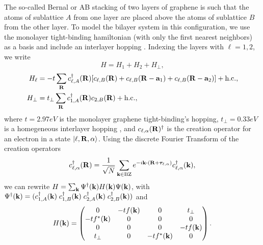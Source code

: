 \documentclass[12pt]{report}
\begin{document}
The so-called Bernal or AB stacking of two layers of graphene is such that the atoms of sublattice $A$ from one layer are placed above the atoms of sublattice $B$ from the other layer.
To model the bilayer system in this configuration, we use the monolayer tight-binding hamiltonian (with only the first
nearest neighbors) as a basis and include an interlayer hopping \cite{handbook2019}. Indexing the layers with $\ell = 1, 2$, we write
\begin{equation} \label{eq:ab-hamil}
H = H_1 + H_2 + H_{\perp},
\end{equation}
\begin{equation} \label{eq:ab-slg-hamil}
\begin{split}
H_\ell &= -t \sum_{\vb{R}} c_{\ell,A}^\dagger(\vb{R}) [c_{\ell,B}(\vb{R}) + c_{\ell,B}(\vb{R}-\vb{a}_1) + c_{\ell,B}(\vb{R}-\vb{a}_2)] + {\text{h.c.}}, \\
H_\perp &= t_{\perp} \sum_{\vb{R}} c_{1,A}^\dagger(\vb{R}) c_{2,B}(\vb{R}) + {\text{h.c.}},
\end{split}
\end{equation}
where $t = 2.97 \unit{eV}$ is the monolayer graphene tight-binding's hopping, $t_\perp = 0.33 \unit{eV}$ is a homegeneous interlayer hopping \cite{handbook2019}, and $c_{\ell,\alpha}(\vb{R})^\dagger$ is the creation operator for an electron in a state $\ket{\ell,\vb{R},\alpha}$. Using the discrete Fourier Transform of the creation operators
\begin{equation} \label{eq:ft-creatio}
c_{\ell,\alpha}^\d(\R) = \frac{1}{\sqrt{N}} \sum_{\k\in\text{BZ}} e^{-i\k\vdot(\R+\bm{\tau}_{\ell,\alpha})} c_{\ell,\alpha}^\d(\k),
\end{equation}
we can rewrite $H = \sum_{{\vb{k}}} \Psi^\dagger({\vb{k}}) H({\vb{k}}) \Psi({\vb{k}})$, with $\Psi^\dagger({\vb{k}}) = (c_{1,A}^\dagger({\vb{k}}) \; c_{1,B}^\dagger({\vb{k}}) \; c_{2,A}^\dagger({\vb{k}}) \; c_{2,B}^\dagger({\vb{k}}))$ and
\begin{equation} \label{eq:ab-momentum_space}
H({\vb{k}}) =
\begin{pmatrix}
0 & -t f({\vb{k}}) & 0 & t_\perp \\
-t f^*({\vb{k}}) & 0 & 0 & 0 \\
0 & 0 & 0 & -t f({\vb{k}}) \\
t_\perp & 0 & -t f^*({\vb{k}}) & 0 \\
\end{pmatrix}.
\end{equation}
\end{document}
